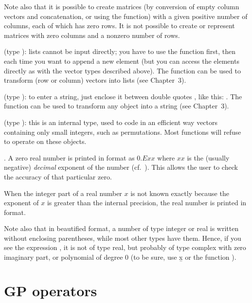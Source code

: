 Note also that it is possible to create matrices (by conversion of empty
column vectors and concatenation, or using the  function) with a
given positive number of columns, each of which has zero rows. It is not
possible to create or represent matrices with zero columns and a nonzero
number of rows.

 (type ): lists cannot be input
directly; you have to use the function  first, then
 each time you want to append a new element (but you can access
the elements directly as with the vector types described above). The function
 can be used to transform (row or column) vectors into lists (see
Chapter~3).

 (type ): to
enter a string, just enclose it between double quotes , like this:
. The function  can be used to transform any
object into a string (see Chapter~3).

 (type ): this is an internal type,
used to code in an efficient way vectors containing only small integers, such
as permutations. Most  functions will refuse to operate on these
objects.

. A zero real number is printed in 
format as $0.Exx$ where $xx$ is the (usually negative) \emph{decimal}
exponent of the number (cf.~). This allows the user to
check the accuracy of that particular zero.

When the integer part of a real number $x$ is not known exactly because the
exponent of $x$ is greater than the internal precision, the real number is
printed in  format.

Note also that in beautified format, a number of type integer or real is
written without enclosing parentheses, while most other types have them.
Hence, if you see the expression , it is not of type real, but
probably of type complex with zero imaginary part, or polynomial of degree $0$
(to be sure, use \b{x} or the function ).

\section{GP operators}\label{se:operators}

